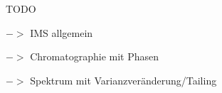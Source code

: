 \documentclass[a4paper,11pt]{article}
\begin{document}

\nocite{Baumbach2009}


TODO

$->$ IMS allgemein

$->$ Chromatographie mit Phasen

$->$ Spektrum mit Varianzveränderung/Tailing
\end{document}
